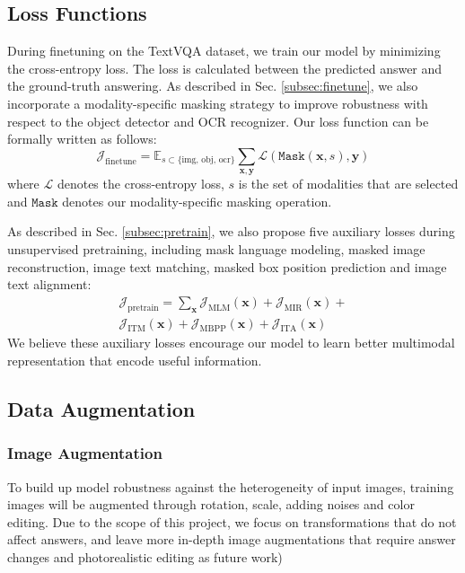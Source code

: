 \documentclass[11pt,a4paper]{article}
\begin{document}
\subsection{Loss Functions}
During finetuning on the TextVQA dataset, we train our model by minimizing the cross-entropy loss. The loss is calculated between the predicted answer and the ground-truth answering. As described in Sec. \ref{subsec:finetune}, we also incorporate a modality-specific masking strategy to improve robustness with respect to the object detector and OCR recognizer. Our loss function can be formally written as follows:
\begin{equation}
    \mathcal{J}_{\text{finetune}} = \mathbb{E}_{s \subset \{\text{img, obj, ocr}\}}\sum_{\mathbf{x}, \mathbf{y}} \mathcal{L}(\texttt{Mask}(\mathbf{x}, s), \mathbf{y})
\end{equation}
where $\mathcal{L}$ denotes the cross-entropy loss, $s$ is the set of modalities that are selected and $\texttt{Mask}$ denotes our modality-specific masking operation.

As described in Sec. \ref{subsec:pretrain}, we also propose five auxiliary losses during unsupervised pretraining, including mask language modeling, masked image reconstruction, image text matching, masked box position prediction and image text alignment:
\begin{multline}
    \mathcal{J}_{\text{pretrain}} = \sum_{\mathbf{x}} \mathcal{J}_{\text{MLM}}(\mathbf{x}) + \mathcal{J}_{\text{MIR}}(\mathbf{x}) +\\ \mathcal{J}_{\text{ITM}}(\mathbf{x}) +\mathcal{J}_{\text{MBPP}}(\mathbf{x}) +\mathcal{J}_{\text{ITA}}(\mathbf{x})
\end{multline}
We believe these auxiliary losses encourage our model to learn better multimodal representation that encode useful information.

\subsection{Data Augmentation}
\subsubsection{Image Augmentation}
To build up model robustness against the heterogeneity of input images, training images will be augmented through rotation, scale, adding noises and color editing. Due to the scope of this project, we focus on transformations that do not affect answers, and leave more in-depth image augmentations that require answer changes and photorealistic editing as future work)
\end{document}
